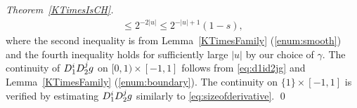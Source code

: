 \begin{proof}[Theorem~\ref{KTimesIsCH}]
\begin{align}
  \le 2^{-2 \lvert u \rvert}
  \le 2^{-\lvert u \rvert + 1} (1 - s), 
  \label{eq:sizeofderivative}
 \end{align}
where the second inequality is from 
Lemma~\ref{KTimesFamily} (\ref{enum:smooth})
and the fourth inequality holds for sufficiently large $\lvert u \rvert$
by our choice of $\gamma$. 
The continuity of $D _1 ^i D _2 ^j g$ on $[0,1) \times [-1, 1]$ follows
from \eqref{eq:d1id2jg} and Lemma~\ref{KTimesFamily} (\ref{enum:boundary}).
The continuity on $\{1\} \times [-1, 1]$ is verified by 
estimating $D_1^{i} D_2^{j} g$ similarly to \eqref{eq:sizeofderivative}. 
\qed
\end{proof} 

